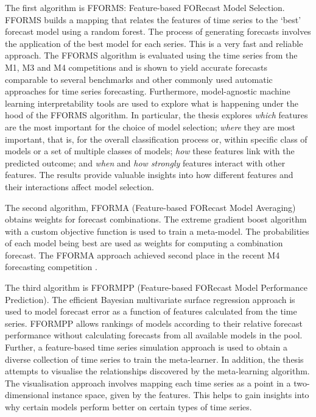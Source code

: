 \documentclass{monashthesis}
\begin{document}
The first algorithm is FFORMS: Feature-based FORecast Model Selection. FFORMS builds a mapping that relates the features of time series to the `best' forecast model using a random forest. The process of generating forecasts involves the application of the best model for each series. This is a very fast and reliable approach. The FFORMS algorithm is evaluated using the time series from the M1, M3 and M4 competitions and is shown to yield accurate forecasts comparable to several benchmarks and other commonly used automatic approaches for time series forecasting. Furthermore, model-agnostic machine learning interpretability tools are used to explore what is happening under the hood of the FFORMS algorithm. In particular, the thesis explores \emph{which} features are the most important for the choice of model selection; \emph{where} they are most important, that is, for the overall classification process or, within specific class of models or a set of multiple classes of models; \emph{how} these features link with the predicted outcome; and \emph{when} and \emph{how strongly} features interact with other features. The results provide valuable insights into how different features and their interactions affect model selection.

The second algorithm, FFORMA (Feature-based FORecast Model Averaging) obtains weights for forecast combinations. The extreme gradient boost algorithm with a custom objective function is used to train a meta-model. The probabilities of each model being best are used as weights for computing a combination forecast. The FFORMA approach achieved second place in the recent M4 forecasting competition \autocite{makridakis2018m4}.

The third algorithm is FFORMPP (Feature-based FORecast Model Performance Prediction). The efficient Bayesian multivariate surface regression approach is used to model forecast error as a function of features calculated from the time series. FFORMPP allows rankings of models according to their relative forecast performance without calculating forecasts from all available models in the pool. Further, a feature-based time series simulation approach is used to obtain a diverse collection of time series to train the meta-learner. In addition, the thesis attempts to visualise the relationships discovered by the meta-learning algorithm. The visualisation approach involves mapping each time series as a point in a two-dimensional instance space, given by the features. This helps to gain insights into why certain models perform better on certain types of time series.
\end{document}
